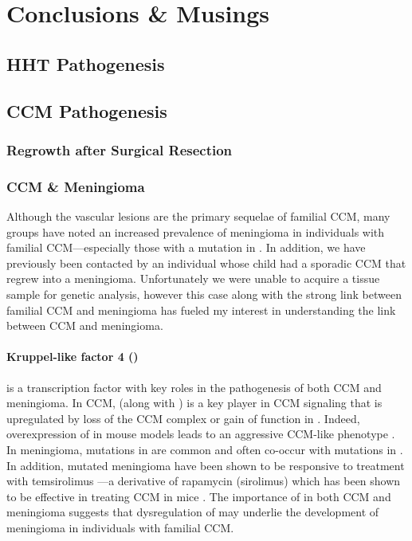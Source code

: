 \chapter{Conclusions \& Musings}



\section{HHT Pathogenesis}






\section{CCM Pathogenesis}
\subsection{Regrowth after Surgical Resection}
\subsection{CCM \& Meningioma}
Although the vascular lesions are the primary sequelae of familial CCM, many groups have noted an increased prevalence of meningioma in individuals with familial CCM—especially those with a mutation in  \citep{labauge2009, riant2013, garaci2015}. In addition, we have previously been contacted by an individual whose child had a sporadic CCM that regrew into a meningioma. Unfortunately we were unable to acquire a tissue sample for genetic analysis, however this case along with the strong link between familial CCM and meningioma has fueled my interest in understanding the link between CCM and meningioma. 
\subsubsection{Kruppel-like factor 4 ()}
 is a transcription factor with key roles in the pathogenesis of both CCM and meningioma. In CCM,  (along with ) is a key player in CCM signaling that is upregulated by loss of the CCM complex or gain of function in  \citep{cuttano2016, zhou2016}. Indeed, overexpression of  in mouse models leads to an aggressive CCM-like phenotype \citep{ren2021}. In meningioma, mutations in  are common and often co-occur with mutations in  \citep{reuss2013}. In addition,  mutated meningioma have been shown to be responsive to treatment with temsirolimus \citep{vonSpreckelsen2020}—a derivative of rapamycin (sirolimus) which has been shown to be effective in treating CCM in mice \citep{ren2021}. The importance of  in both CCM and meningioma suggests that dysregulation of  may underlie the development of meningioma in individuals with familial CCM. 

